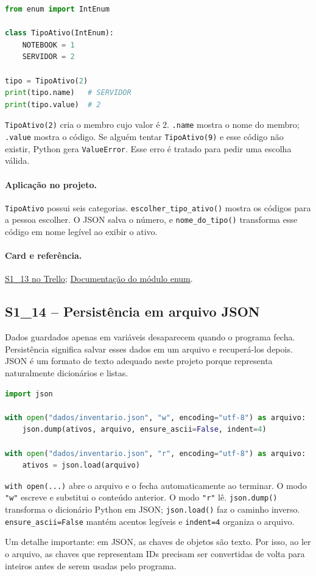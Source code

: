 \documentclass[11pt,a4paper]{article}
\newcommand{\projeto}{\paragraph{Aplicação no projeto.}}
\newcommand{\referencia}[2]{\paragraph{Card e referência.}\href{#1}{#2}}
\newcommand{\cardsection}[1]{\Needspace{12\baselineskip}\subsection{#1}}
\begin{document}
\begin{lstlisting}[language=Python,caption={Exemplo de IntEnum}]
from enum import IntEnum

class TipoAtivo(IntEnum):
    NOTEBOOK = 1
    SERVIDOR = 2

tipo = TipoAtivo(2)
print(tipo.name)   # SERVIDOR
print(tipo.value)  # 2
\end{lstlisting}

\texttt{TipoAtivo(2)} cria o membro cujo valor é 2. \texttt{.name} mostra o nome do membro; \texttt{.value} mostra o código. Se alguém tentar \texttt{TipoAtivo(9)} e esse código não existir, Python gera \texttt{ValueError}. Esse erro é tratado para pedir uma escolha válida.

\projeto
\texttt{TipoAtivo} possui seis categorias. \texttt{escolher\_tipo\_ativo()} mostra os códigos para a pessoa escolher. O JSON salva o número, e \texttt{nome\_do\_tipo()} transforma esse código em nome legível ao exibir o ativo.

\referencia{https://trello.com/c/nJrQKljh}{S1\_13 no Trello}; \href{https://docs.python.org/3/library/enum.html}{Documentação do módulo enum}.

\cardsection{S1\_14 -- Persistência em arquivo JSON}

Dados guardados apenas em variáveis desaparecem quando o programa fecha. Persistência significa salvar esses dados em um arquivo e recuperá-los depois. JSON é um formato de texto adequado neste projeto porque representa naturalmente dicionários e listas.

\begin{lstlisting}[language=Python,caption={Gravar e ler JSON}]
import json

with open("dados/inventario.json", "w", encoding="utf-8") as arquivo:
    json.dump(ativos, arquivo, ensure_ascii=False, indent=4)

with open("dados/inventario.json", "r", encoding="utf-8") as arquivo:
    ativos = json.load(arquivo)
\end{lstlisting}

\texttt{with open(...)} abre o arquivo e o fecha automaticamente ao terminar. O modo \texttt{"w"} escreve e substitui o conteúdo anterior. O modo \texttt{"r"} lê. \texttt{json.dump()} transforma o dicionário Python em JSON; \texttt{json.load()} faz o caminho inverso. \texttt{ensure\_ascii=False} mantém acentos legíveis e \texttt{indent=4} organiza o arquivo.

Um detalhe importante: em JSON, as chaves de objetos são texto. Por isso, ao ler o arquivo, as chaves que representam IDs precisam ser convertidas de volta para inteiros antes de serem usadas pelo programa.
\end{document}

